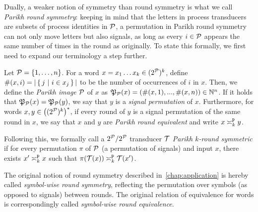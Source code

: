 Dually, a weaker notion of symmetry than round symmetry is what we call \emph{Parikh round symmetry}: keeping in mind that the letters in process transducers are subsets of process identities in $\cP$, a permutation in Parikh round symmetry can not only move letters but also signals, as long as every $i\in \cP$ appears the same number of times in the round as originally. To state this formally, we first need to expand our terminology a step further.

Let $\cP=\{1,\dots,n\}$. For a word $x=x_1\dots x_k \in (2^\cP)^k$, define $\#(x,i) = |\condset{j}{i \in x_j}|$ to be the number of occurrences of $i$ in $x$. Then, we define the \emph{Parikh image \WRT $\cP$} of $x$ as $\fP_\cP(x) = (\#(x,1),...,\#(x,n))\in \bbN^n$. If it holds that $\fP_\cP(x)=\fP_\cP(y)$, we say that $y$ is a \emph{signal permutation} of $x$. Furthermore, for words $x,y\in\left((2^\cP)^k\right)^*$, if every round of $y$ is a signal permutation of the same round in $x$, we say that $x$ and $y$ are \emph{Parikh round equivalent} and write $x\reqtype[k]{p} y$.

Following this, we formally call a $2^\cP/2^\cP$ transducer $\cT$ \emph{Parikh $k$-round symmetric} if for every permutation $\pi$ of $\cP$ (a permutation of signals) and input $x$, there exists $x'\reqtype[k]{p} x$ such that $\pi(\cT(x))\reqtype[k]{p} \cT(x')$.

The original notion of round symmetry described in~\cref{chap:application} is hereby called \emph{symbol-wise round symmetry}, reflecting the permutation over symbols (as opposed to signals) between rounds. The original relation of equivalence for words is correspondingly called \emph{symbol-wise round equivalence}.

